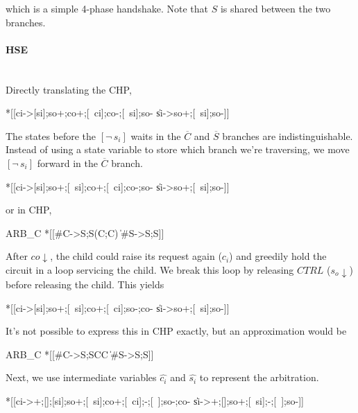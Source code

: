 \documentclass[aer.tex]{subfiles}
\begin{document}
\noindent which is a simple 4-phase handshake. Note that $S$ is shared between the two branches.

\paragraph{HSE}\mbox{}\\

\noindent Directly translating the CHP,

\begin{hse}
*[[ci->[si];so+;co+;[~ci];co-;[~si];so-
  \|si->so+;[~si];so-]]
\end{hse}

The states before the $[\neg\,s_i]$ waits in the $\overline{C}$ and $\overline{S}$ branches are indistinguishable. Instead of using a state variable to store which branch we're traversing, we move $[\neg\,s_i]$ forward in the $\overline{C}$ branch. 

\begin{hse}
*[[ci->[si];so+;[~si];co+;[~ci];co-;so-
  \|si->so+;[~si];so-]]
\end{hse}

\noindent or in CHP,

\begin{csp}
ARB_C\equiv
*[[#C->S;S\star(C;C)
  \|#S->S;S]]
\end{csp}

\noindent After $co\!\downarrow$, the child could raise its request again ($c_i$) and greedily hold the circuit in a loop servicing the child. 
We break this loop by releasing $CTRL$ ($s_o\!\downarrow$) before releasing the child. This yields

\begin{hse}
*[[ci->[si];so+;[~si];co+;[~ci];so-;co-
  \|si->so+;[~si];so-]]
\end{hse}

\noindent It's not possible to express this in CHP exactly, but an approximation would be

\begin{csp}
ARB_C\equiv
*[[#C->S;S\star\!C\star\!C
  \|#S->S;S]]
\end{csp}

\noindent Next, we use intermediate variables $\hat{c_i}$ and $\hat{s_i}$ to represent the arbitration.

\begin{hse}
*[[ci->+;[];[si];so+;[~si];co+;[~ci];-;[~];so-;co-
  \|si->+;[];so+;[~si];-;[~];so-]]
\end{hse}
\end{document}
